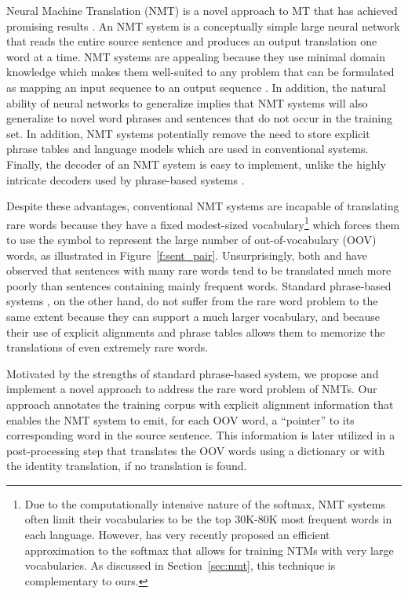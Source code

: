 
Neural Machine
Translation (NMT) is a novel approach to MT that has 
achieved promising results \cite{kal13,sutskever14,cho14,bog15,jean15}. 
An NMT system is a conceptually simple large neural network that 
reads the entire source sentence and produces an output translation one word at a time.
NMT systems are appealing because they use minimal domain knowledge which
makes them well-suited to any problem that can be formulated as mapping an input sequence 
to an output sequence \cite{sutskever14}.
In addition, the natural ability of neural networks to generalize implies that 
NMT systems will also generalize to novel word phrases and sentences that do not occur in the
training set. 
In addition, NMT systems potentially remove the need to store explicit phrase tables 
and language models which are used in conventional systems. 
Finally, the decoder of an NMT system is easy to implement, unlike the highly
intricate decoders used by phrase-based systems \cite{Koehn:2003:SMT}.

Despite these advantages, conventional NMT systems are incapable of translating rare 
words because they have a fixed modest-sized vocabulary\footnote{ Due to the computationally intensive nature of the softmax, NMT systems often limit 
their vocabularies to be the top 30K-80K most frequent words in each language. However, 
has very recently proposed an efficient approximation to the softmax that allows
for training NTMs with very large vocabularies. As discussed in Section~\ref{sec:nmt}, this technique is complementary to ours.}
which forces them to use the \unksym{} symbol to 
represent the large number of out-of-vocabulary (OOV) words, as illustrated in Figure~\ref{f:sent_pair}.
Unsurprisingly, both  and  have
observed that sentences with many rare words tend to be translated much more poorly than sentences
containing mainly frequent words.
%
Standard phrase-based systems \cite{koehn2007moses,chiang07hiero,cer10phrasal,dyer10cdec}, 
on the other hand, do not suffer from the rare word 
problem to the same extent because they can support a much larger vocabulary, 
and because their use of explicit alignments
and phrase tables allows them to memorize the translations 
of even extremely rare words. 

Motivated by the strengths of standard phrase-based system, we
propose and implement a novel approach to address the rare word problem of NMTs.
Our approach annotates the training corpus with 
explicit alignment information that enables the NMT system to emit, for each OOV word, a
``pointer'' to its corresponding word in the source sentence. This
information is later utilized in a post-processing step that translates
the OOV words using a dictionary or with the identity translation, if no translation is found.

